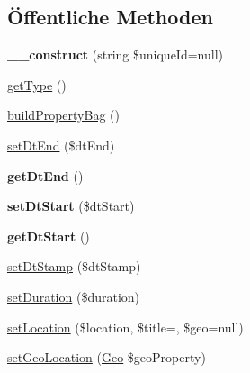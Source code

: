 \subsection*{Öffentliche Methoden}
\begin{DoxyCompactItemize}
\item 
\mbox{\label{class_eluceo_1_1i_cal_1_1_component_1_1_event_aef22cbf45d882cfdf42290b5a70b50d4}} 
{\bfseries \+\_\+\+\_\+construct} (string \$unique\+Id=null)
\item 
\mbox{\hyperlink{class_eluceo_1_1i_cal_1_1_component_1_1_event_a705569387e533a6530b6696f3f157337}{get\+Type}} ()
\item 
\mbox{\hyperlink{class_eluceo_1_1i_cal_1_1_component_1_1_event_af5012821fe765f4901f9e18cdc0c33c5}{build\+Property\+Bag}} ()
\item 
\mbox{\hyperlink{class_eluceo_1_1i_cal_1_1_component_1_1_event_a89e2bf9ddc7f1ea8f4ddce0d287d0b6e}{set\+Dt\+End}} (\$dt\+End)
\item 
\mbox{\label{class_eluceo_1_1i_cal_1_1_component_1_1_event_a49fbe4c0f59c7a8bb28f8e417c64120a}} 
{\bfseries get\+Dt\+End} ()
\item 
\mbox{\label{class_eluceo_1_1i_cal_1_1_component_1_1_event_a4a0ac3f8c1c18435b67c7be2474c0ed1}} 
{\bfseries set\+Dt\+Start} (\$dt\+Start)
\item 
\mbox{\label{class_eluceo_1_1i_cal_1_1_component_1_1_event_a68e770ea9835241b33a10b5833edf50e}} 
{\bfseries get\+Dt\+Start} ()
\item 
\mbox{\hyperlink{class_eluceo_1_1i_cal_1_1_component_1_1_event_a395b6bc368752cb4f2dbe0fac3b4bc8f}{set\+Dt\+Stamp}} (\$dt\+Stamp)
\item 
\mbox{\hyperlink{class_eluceo_1_1i_cal_1_1_component_1_1_event_aaa4ee424e98d66778e0af4c7c0e4994f}{set\+Duration}} (\$duration)
\item 
\mbox{\hyperlink{class_eluceo_1_1i_cal_1_1_component_1_1_event_a44f4216a540e32fe3d18015e24bc40b5}{set\+Location}} (\$location, \$title=\textquotesingle{}\textquotesingle{}, \$geo=null)
\item 
\mbox{\hyperlink{class_eluceo_1_1i_cal_1_1_component_1_1_event_a7dcac1158135e60a3dd6422ec8c480c3}{set\+Geo\+Location}} (\mbox{\hyperlink{class_eluceo_1_1i_cal_1_1_property_1_1_event_1_1_geo}{Geo}} \$geo\+Property)

\end{DoxyCompactItemize}
